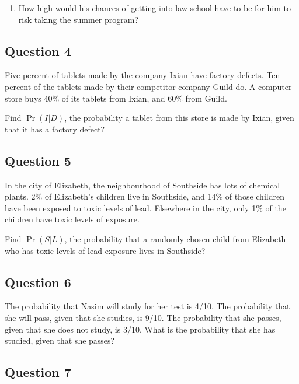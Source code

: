 \documentclass[11pt,]{article}
\providecommand{\tightlist}{%
  \setlength{\itemsep}{0pt}\setlength{\parskip}{0pt}}
\begin{document}
\begin{enumerate}
\def\labelenumi{\arabic{enumi}.}
\setcounter{enumi}{2}
\tightlist
\item
  How high would his chances of getting into law school have to be for
  him to risk taking the summer program?
\end{enumerate}

\hypertarget{question-4}{%
\subsection{Question 4}\label{question-4}}

Five percent of tablets made by the company Ixian have factory defects.
Ten percent of the tablets made by their competitor company Guild do. A
computer store buys 40\% of its tablets from Ixian, and 60\% from Guild.

Find \(\Pr(I | D)\), the probability a tablet from this store is made by
Ixian, given that it has a factory defect?

\hypertarget{question-5}{%
\subsection{Question 5}\label{question-5}}

In the city of Elizabeth, the neighbourhood of Southside has lots of
chemical plants. 2\% of Elizabeth's children live in Southside, and 14\%
of those children have been exposed to toxic levels of lead. Elsewhere
in the city, only 1\% of the children have toxic levels of exposure.

Find \(\Pr(S | L)\), the probability that a randomly chosen child from
Elizabeth who has toxic levels of lead exposure lives in Southside?

\hypertarget{question-6}{%
\subsection{Question 6}\label{question-6}}

The probability that Nasim will study for her test is 4/10. The
probability that she will pass, given that she studies, is 9/10. The
probability that she passes, given that she does not study, is 3/10.
What is the probability that she has studied, given that she passes?

\hypertarget{question-7}{%
\subsection{Question 7}\label{question-7}}
\end{document}
